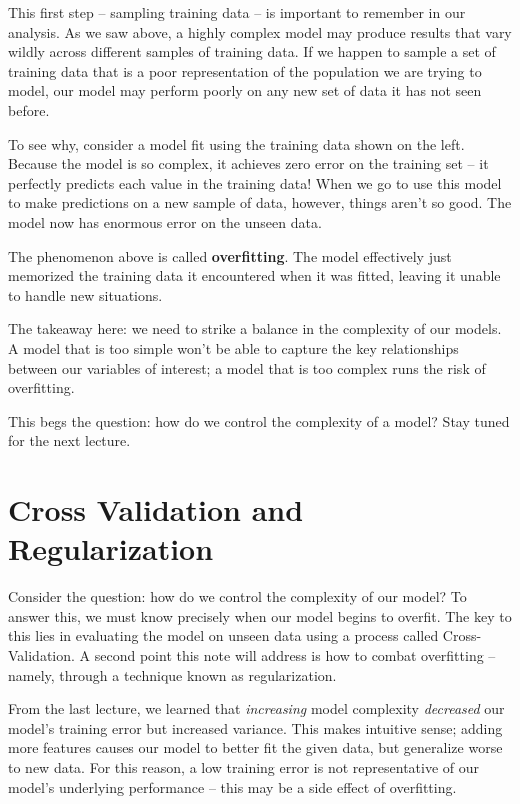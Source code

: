 \documentclass[
  letterpaper,
  DIV=11,
  numbers=noendperiod]{scrreprt}
\begin{document}
This first step -- sampling training data -- is important to remember in
our analysis. As we saw above, a highly complex model may produce
results that vary wildly across different samples of training data. If
we happen to sample a set of training data that is a poor representation
of the population we are trying to model, our model may perform poorly
on any new set of data it has not seen before.

To see why, consider a model fit using the training data shown on the
left. Because the model is so complex, it achieves zero error on the
training set -- it perfectly predicts each value in the training data!
When we go to use this model to make predictions on a new sample of
data, however, things aren't so good. The model now has enormous error
on the unseen data.

The phenomenon above is called \textbf{overfitting}. The model
effectively just memorized the training data it encountered when it was
fitted, leaving it unable to handle new situations.

The takeaway here: we need to strike a balance in the complexity of our
models. A model that is too simple won't be able to capture the key
relationships between our variables of interest; a model that is too
complex runs the risk of overfitting.

This begs the question: how do we control the complexity of a model?
Stay tuned for the next lecture.


\hypertarget{cross-validation-and-regularization}{%
\chapter{Cross Validation and
Regularization}\label{cross-validation-and-regularization}}

Consider the question: how do we control the complexity of our model? To
answer this, we must know precisely when our model begins to overfit.
The key to this lies in evaluating the model on unseen data using a
process called Cross-Validation. A second point this note will address
is how to combat overfitting -- namely, through a technique known as
regularization.

From the last lecture, we learned that \emph{increasing} model
complexity \emph{decreased} our model's training error but increased
variance. This makes intuitive sense; adding more features causes our
model to better fit the given data, but generalize worse to new data.
For this reason, a low training error is not representative of our
model's underlying performance -- this may be a side effect of
overfitting.
\end{document}
